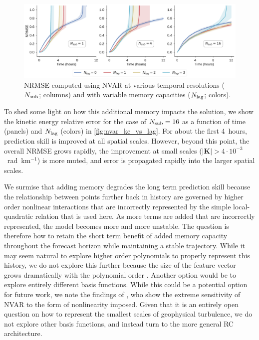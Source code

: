 \begin{figure}
    \centering
    \includegraphics[width=\textwidth]{../figures/nvar_nrmse_vs_memory.pdf}
    \caption{NRMSE computed using NVAR at various temporal resolutions
        ($N_\text{sub}$; columns) and with variable memory capacities ($N_\text{lag}$;
        colors).
    }
    \label{fig:nvar_nrmse_vs_lag}
\end{figure}

To shed some light on how this additional memory impacts the solution,
we show the kinetic energy relative error
for the case of $N_\text{sub}=16$ as a function of time (panels) and $N_\text{lag}$ (colors)
in \cref{fig:nvar_ke_vs_lag}.
For about the first 4~hours, prediction skill is improved at all spatial scales.
However, beyond this point, the overall NRMSE grows rapidly, the improvement
at small scales ($|\mathbf{K}|>4\cdot10^{-3}$~rad~km$^{-1}$) is more muted,
and error is propagated rapidly into the larger spatial scales.

We surmise that adding memory degrades the long term prediction skill because
the relationship between points further back in history are governed by higher
order nonlinear interactions that are incorrectly represented by
the simple local-quadratic relation that is used here.
As more terms are added that are incorrectly represented, the model becomes
more and more unstable.
The question is therefore how to retain the short term benefit of added memory
capacity throughout the forecast horizon while maintaining a stable trajectory.
While it may seem natural to explore higher order polynomials to
properly represent this history, we do not explore this further because the size
of the feature vector grows dramatically with the polynomial order
\citep{chen_next_2022}.
Another option would be to explore entirely different basis functions.
While this could be a potential option for future work, we note the findings of
\citet{zhang_catch-22_2022}, who show the extreme sensitivity of NVAR to the
form of nonlinearity imposed.
Given that it is an entirely open question on how to represent the smallest
scales of geophysical turbulence, we do not explore other basis functions, and
instead turn to the more general RC architecture.

